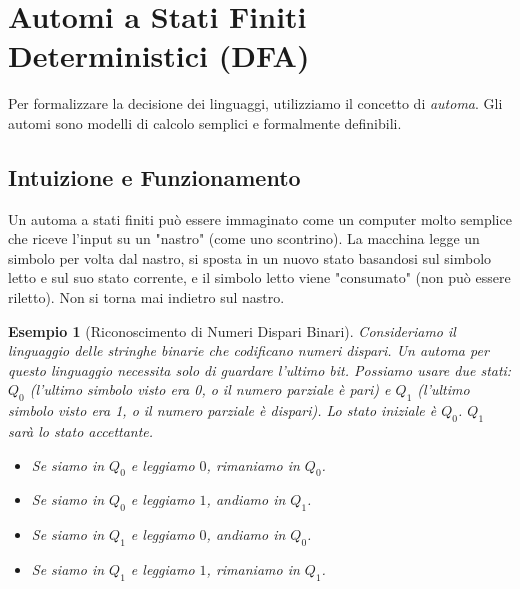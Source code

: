 \documentclass[a4paper]{article}
\newtheorem{example}{Esempio}[section]
\begin{document}
\section{Automi a Stati Finiti Deterministici (DFA)}
Per formalizzare la decisione dei linguaggi, utilizziamo il concetto di \emph{automa}. Gli automi sono modelli di calcolo semplici e formalmente definibili.

\subsection{Intuizione e Funzionamento}
Un automa a stati finiti può essere immaginato come un computer molto semplice che riceve l'input su un "nastro" (come uno scontrino). La macchina legge un simbolo per volta dal nastro, si sposta in un nuovo stato basandosi sul simbolo letto e sul suo stato corrente, e il simbolo letto viene "consumato" (non può essere riletto). Non si torna mai indietro sul nastro.

\begin{example}[Riconoscimento di Numeri Dispari Binari]
Consideriamo il linguaggio delle stringhe binarie che codificano numeri dispari. Un automa per questo linguaggio necessita solo di guardare l'ultimo bit. Possiamo usare due stati: $Q_0$ (l'ultimo simbolo visto era 0, o il numero parziale è pari) e $Q_1$ (l'ultimo simbolo visto era 1, o il numero parziale è dispari). Lo stato iniziale è $Q_0$. $Q_1$ sarà lo stato accettante.
\begin{itemize}
    \item Se siamo in $Q_0$ e leggiamo $0$, rimaniamo in $Q_0$.
    \item Se siamo in $Q_0$ e leggiamo $1$, andiamo in $Q_1$.
    \item Se siamo in $Q_1$ e leggiamo $0$, andiamo in $Q_0$.
    \item Se siamo in $Q_1$ e leggiamo $1$, rimaniamo in $Q_1$.
\end{itemize}
\begin{center}
\end{center}
\end{example}
\end{document}
